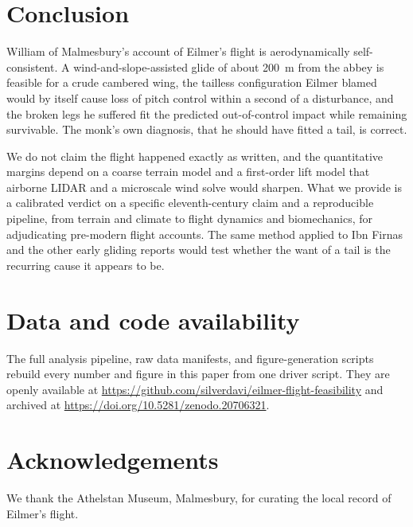 \section{Conclusion}

William of Malmesbury's account of Eilmer's flight is aerodynamically
self-consistent.
A wind-and-slope-assisted glide of about \SI{200}{\meter} from the abbey is feasible
for a crude cambered wing, the tailless configuration Eilmer blamed would by itself
cause loss of pitch control within a second of a disturbance, and the broken legs he
suffered fit the predicted out-of-control impact while remaining survivable.
The monk's own diagnosis, that he should have fitted a tail, is correct.

We do not claim the flight happened exactly as written, and the quantitative margins
depend on a coarse terrain model and a first-order lift model that airborne LIDAR and
a microscale wind solve would sharpen.
What we provide is a calibrated verdict on a specific eleventh-century claim and a
reproducible pipeline, from terrain and climate to flight dynamics and biomechanics,
for adjudicating pre-modern flight accounts.
The same method applied to Ibn Firnas and the other early gliding reports would test
whether the want of a tail is the recurring cause it appears to be.

\section*{Data and code availability}

The full analysis pipeline, raw data manifests, and figure-generation scripts
rebuild every number and figure in this paper from one driver script. They are
openly available at \url{https://github.com/silverdavi/eilmer-flight-feasibility}
and archived at \url{https://doi.org/10.5281/zenodo.20706321}.

\section*{Acknowledgements}

We thank the Athelstan Museum, Malmesbury, for curating the local record of Eilmer's
flight.
